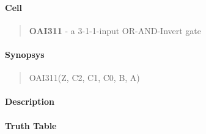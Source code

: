 \label{OAI311}
\paragraph{Cell}
\begin{quote}
    \textbf{OAI311} - a 3-1-1-input OR-AND-Invert gate
\end{quote}

\paragraph{Synopsys}
\begin{quote}
    OAI311(Z, C2, C1, C0, B, A)
\end{quote}

\paragraph{Description}



\paragraph{Truth Table}


